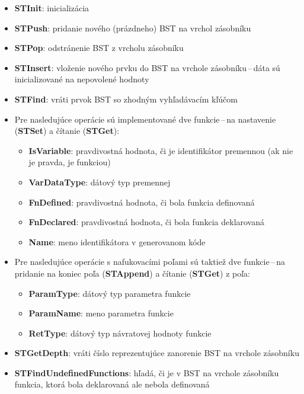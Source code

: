 \documentclass[a4paper, 12pt]{article}
\begin{document}
\begin{itemize}
    \item \textbf{STInit}: inicializácia
    \item \textbf{STPush}: pridanie nového (prázdneho) BST na vrchol zásobníku
    \item \textbf{STPop}: odstránenie BST z vrcholu zásobníku
    \item \textbf{STInsert}: vloženie nového prvku do BST na vrchole zásobníku\,--\,dáta sú inicializované na nepovolené hodnoty
    \item \textbf{STFind}: vráti prvok BST so zhodným vyhľadávacím kľúčom
    \item Pre nasledujúce operácie sú implementované dve funkcie\,--\,na nastavenie (\textbf{STSet}) a čítanie (\textbf{STGet}):
    \begin{itemize}
        \item \textbf{IsVariable}: pravdivostná hodnota, či je identifikátor premennou (ak nie je pravda, je funkciou)
        \item \textbf{VarDataType}: dátový typ premennej
        \item \textbf{FnDefined}: pravdivostná hodnota, či bola funkcia definovaná
        \item \textbf{FnDeclared}: pravdivostná hodnota, či bola funkcia deklarovaná
        \item \textbf{Name}: meno identifikátora v generovanom kóde
    \end{itemize}
    \item Pre nasledujúce operácie s nafukovacími poľami sú taktiež dve funkcie\,--\,na pridanie na koniec poľa (\textbf{STAppend}) a čítanie (\textbf{STGet}) z poľa:
    \begin{itemize}
        \item \textbf{ParamType}: dátový typ parametra funkcie
        \item \textbf{ParamName}: meno parametra funkcie
        \item \textbf{RetType}: dátový typ návratovej hodnoty funkcie
    \end{itemize}
    \item \textbf{STGetDepth}: vráti číslo reprezentujúce zanorenie BST na vrchole zásobníku
    \item \textbf{STFindUndefinedFunctions}: hľadá, či je v BST na vrchole zásobníku funkcia, ktorá bola deklarovaná ale nebola definovaná
    
    
\end{itemize}
\end{document}
